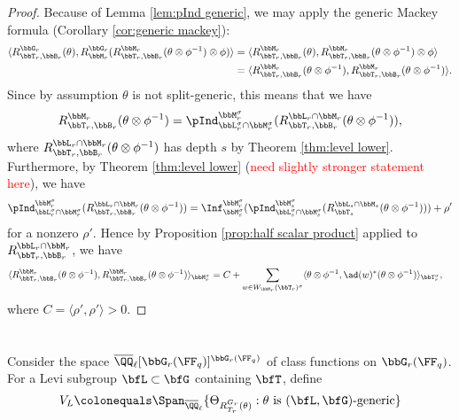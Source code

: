 \begin{proof}
Because of Lemma \ref{lem:pInd generic}, we may apply the generic Mackey formula (Corollary \ref{cor:generic mackey}):
\begin{align*}
  \langle R_{\bbT_r,\bbB_r}^{\bbG_r}(\theta), R_{\bbM_r}^{\bbG_r}(R_{\bbT_r,\bbB_r}^{\bbM_r}(\theta \otimes \phi^{-1}) \otimes \phi) \rangle 
  &= \langle R_{\bbT_r,\bbB_r}^{\bbM_r}(\theta), R_{\bbT_r,\bbB_r}^{\bbM_r}(\theta \otimes \phi^{-1}) \otimes \phi \rangle \\
  &= \langle R_{\bbT_r,\bbB_r}^{\bbM_r}(\theta \otimes \phi^{-1}), R_{\bbT_r,\bbB_r}^{\bbM_r}(\theta \otimes \phi^{-1}) \rangle.
\end{align*}
Since by assumption $\theta$ is not split-generic, this means that we have
\begin{equation*}
  R_{\bbT_r,\bbB_r}^{\bbM_r}(\theta \otimes \phi^{-1}) = \pInd_{\bbL_r^\sigma \cap \bbM_r^\sigma}^{\bbM_r^\sigma}(R_{\bbT_r,\bbB_r}^{\bbL_r \cap \bbM_r}(\theta \otimes \phi^{-1})),
\end{equation*}
where $R_{\bbT_r,\bbB_r}^{\bbL_r \cap \bbM_r}(\theta \otimes \phi^{-1})$ has depth $s$ by Theorem \ref{thm:level lower}. Furthermore, by Theorem \ref{thm:level lower} (\textcolor{red}{need slightly stronger statement here}), we have
\begin{equation*}
  \pInd_{\bbL_r^\sigma \cap \bbM_r^\sigma}^{\bbM_r^\sigma}(R_{\bbT_r,\bbB_r}^{\bbL_r \cap \bbM_r}(\theta \otimes \phi^{-1})) = \Inf_{\bbM_s^\sigma}^{\bbM_r^\sigma}(\pInd_{\bbL_s^\sigma \cap \bbM_s^\sigma}^{\bbM_s^\sigma}(R_{\bbT_s}^{\bbL_s \cap \bbM_s}(\theta \otimes \phi^{-1}))) + \rho'
\end{equation*}
for a nonzero $\rho'$. Hence by Proposition \ref{prop:half scalar product} applied to $R_{\bbT_r,\bbB_r}^{\bbL_r \cap \bbM_r}$, we have
\begin{align*}
  \langle R_{\bbT_r,\bbB_r}^{\bbM_r}(\theta \otimes \phi^{-1}), R_{\bbT_r,\bbB_r}^{\bbM_r}(\theta \otimes \phi^{-1}) \rangle_{\bbM_r^\sigma}
  &= C + \sum_{w \in W_{\bbM_r}(\bbT_r)^\sigma} \langle \theta \otimes \phi^{-1}, \ad(w)^*(\theta \otimes \phi^{-1}) \rangle_{\bbT_r^\sigma},
\end{align*}
where $C = \langle \rho', \rho' \rangle > 0$.
\end{proof}




\section{}

Consider the space $\overline \QQ_\ell[\bbG_r(\FF_q)]^{\bbG_r(\FF_q)}$ of class functions on $\bbG_r(\FF_q)$. For a Levi subgroup $\bfL \subset \bfG$ containing $\bfT$, define
\begin{equation*}
  V_L \colonequals \Span_{\overline \QQ_\ell}\{\Theta_{R_{T_r}^{G_r}(\theta)} : \text{$\theta$ is $(\bfL,\bfG)$-generic}\}
\end{equation*}

